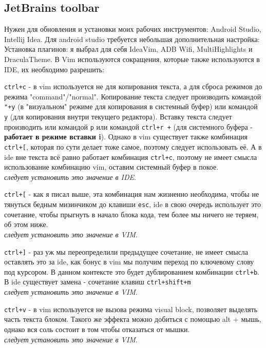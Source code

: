 \documentclass[a4paper, 12pt]{report}
\begin{document}
\subsection{JetBrains toolbar} Нужен для обновления и установки моих рабочих инструментов: Android Studio, Intellij Idea. Для android studio требуется небольшая дополнительная настройка: \\
Установка плагинов: я выбрал для себя IdeaVim, ADB Wifi, MultiHighlights и DraculaTheme. В Vim используются сокращения, которые также используются в IDE, их необходимо разрешить:\\
\begin{list}{*}{}
	\item \lstinline|ctrl+c| - в vim используется не для копирования текста, а для сброса режимов до режима "command"/"normal". Копирование текста следует производить командой \lstinline|"+y| (в "визуальном" режиме для копирования в системный буфер) или командой \lstinline|y| (для копирования внутри текущего редактора). Вставку текста следует производить или командой \lstinline|p| или командой \lstinline|ctrl+r +| (для системного буфера - \textbf{работает в режиме вставки i}). Однако в vim существует также комбинация \lstinline|ctrl+[|, которая по сути делает тоже самое, поэтому следует использовать её. А в ide вне текста всё равно работает комбинация \lstinline|ctrl+c|, поэтому не имеет смысла использование комбинацию vim, оставим системный буфер в покое.\\ \textit{следует установить это значение в IDE}.
	\item \lstinline|ctrl+[| - как я писал выше, эта комбинация нам жизненно необходима, чтобы не тянуться бедным мизинчиком до клавиши \lstinline|esc|, ide в свою очередь использует это сочетание, чтобы прыгнуть в начало блока кода, тем более мы ничего не теряем, об этом ниже.\\ \textit{следует установить это значение в VIM}.
	\item \lstinline|ctrl+]| - раз уж мы переопределили предыдущее сочетание, не имеет смысла оставлять это за ide, как бонус в vim мы получим переход по ключевому слову под курсором. В данном контексте это будет дублированием комбинации \lstinline|ctrl+b|. В ide существует замена - сочетание клавиш \lstinline|ctrl+shift+m|\\ \textit{следует установить это значение в VIM}.
	\item \lstinline|ctrl+v| - в vim используется не вызова режима visual block, позволяет выделять часть текста блоком. Такого же эффекта можно добиться с помощью alt + мышь, однако вся соль состоит в том чтобы отказаться от мышки.\\ \textit{следует установить это значение в VIM}.

\end{list}
\end{document}
